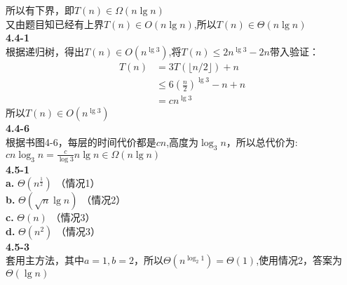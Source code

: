 \documentclass[UTF8]{ctexart}
\begin{document}
所以有下界，即$T(n)\in \Omega(n\lg n)$\\
又由题目知已经有上界$T(n) \in O(n\lg n)$,所以$T(n)\in \Theta(n\lg n)$
\\
\noindent\textbf{4.4-1}\\
根据递归树，得出$T(n)\in O(n^{\lg 3})$,将$T(n) \le 2n^{\lg 3}-2n$带入验证：
\begin{equation}
\nonumber
\begin{split}
T(n)&=3T(\lfloor n/2 \rfloor)+n\\
&\le 6(\frac{n}{2})^{\lg 3}-n+n\\
&= c n^{\lg 3}
\end{split}
\end{equation}
所以$T(n) \in O(n^{\lg 3})$
\\
\noindent\textbf{4.4-6}\\
根据书图4-6，每层的时间代价都是$cn$,高度为$\log_3 n$，所以总代价为:\\
$cn\log_3 n=\frac{c}{\log 3}n\lg n \in \Omega(n\lg n)$\\
\noindent\textbf{4.5-1}\\
\textbf{a.} $\Theta(n^{\frac{1}{2}})$ （情况1）\\
\textbf{b.} $\Theta(\sqrt{n}\lg n)$ （情况2）\\
\textbf{c.} $\Theta(n)$ （情况3）\\
\textbf{d.} $\Theta(n^2)$ （情况3）\\
\noindent\textbf{4.5-3}\\
套用主方法，其中$a=1, b=2$，所以$\Theta (n^{\log_2 1})=\Theta(1)$,使用情况2，答案为$\Theta(\lg n)$
\end{document}

